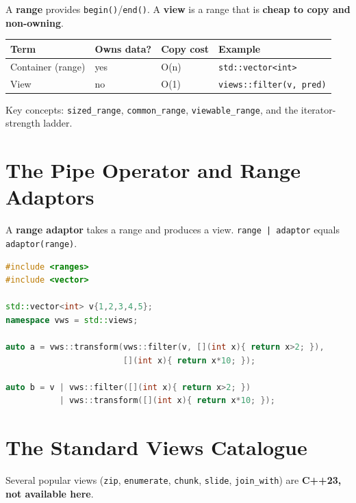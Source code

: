 A \textbf{range} provides \texttt{begin()}/\texttt{end()}. A \textbf{view} is a range that is \textbf{cheap to copy and non-owning}.

\begin{center}
\begin{tabular}{llll}
\hline
\textbf{Term} & \textbf{Owns data?} & \textbf{Copy cost} & \textbf{Example} \\
\hline
Container (range) & yes & O(n) & \texttt{std::vector<int>} \\
View & no & O(1) & \texttt{views::filter(v, pred)} \\
\hline
\end{tabular}
\end{center}

Key concepts: \texttt{sized\_range}, \texttt{common\_range}, \texttt{viewable\_range}, and the iterator-strength ladder.

\section{The Pipe Operator and Range Adaptors}
\label{sec:c20-pipe-adaptors}

A \textbf{range adaptor} takes a range and produces a view. \texttt{range | adaptor} equals \texttt{adaptor(range)}.

\begin{lstlisting}[language=C++,caption={Function-call form and pipe form are equivalent}]
#include <ranges>
#include <vector>

std::vector<int> v{1,2,3,4,5};
namespace vws = std::views;

auto a = vws::transform(vws::filter(v, [](int x){ return x>2; }),
                        [](int x){ return x*10; });

auto b = v | vws::filter([](int x){ return x>2; })
           | vws::transform([](int x){ return x*10; });
\end{lstlisting}

\section{The Standard Views Catalogue}
\label{sec:c20-views-catalogue}

Several popular views (\texttt{zip}, \texttt{enumerate}, \texttt{chunk}, \texttt{slide}, \texttt{join\_with}) are \textbf{C++23, not available here}.

